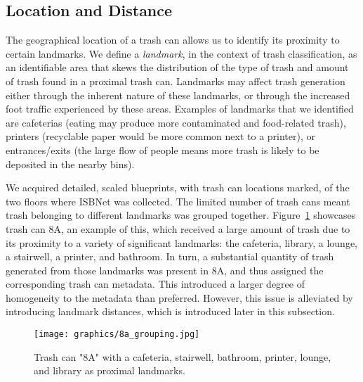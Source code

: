 \documentclass[conference]{ieeeconf}
\begin{document}
\subsection{Location and Distance}
The geographical location of a trash can allows us to identify its proximity to certain landmarks. We define a \emph{landmark}, in the context of trash classification, as an identifiable area that skews the distribution of the type of trash and amount of trash found in a proximal trash can. Landmarks may affect trash generation either through the inherent nature of these landmarks, or through the increased foot traffic experienced by these areas. Examples of landmarks that we identified are cafeterias (eating may produce more contaminated and food-related trash), printers (recyclable paper would be more common next to a printer), or entrances/exits (the large flow of people means more trash is likely to be deposited in the nearby bins).

We acquired detailed, scaled blueprints, with trash can locations marked, of the two floors where ISBNet was collected. The limited number of trash cans meant trash belonging to different landmarks was grouped together. Figure~\ref{fig:8agrouping} showcases trash can 8A, an example of this, which received a large amount of trash due to its proximity to a variety of significant landmarks: the cafeteria, library, a lounge, a stairwell, a printer, and bathroom. In turn, a substantial quantity of trash generated from those landmarks was present in 8A, and thus assigned the corresponding trash can metadata. This introduced a larger degree of homogeneity to the metadata than preferred. However, this issue is alleviated by introducing landmark distances, which is introduced later in this subsection. 

\begin{figure}
\centering
  \texttt{[image: graphics/8a\_grouping.jpg]}
  \caption{Trash can "8A" with a cafeteria, stairwell, bathroom, printer, lounge, and library as proximal landmarks.}
  \label{fig:8agrouping}
\end{figure}


\end{document}
